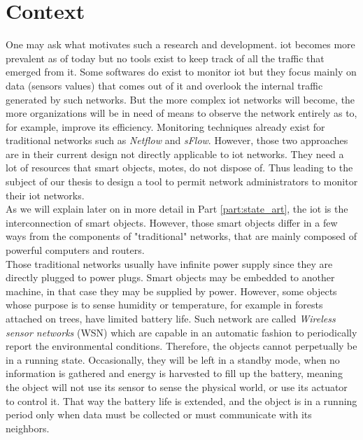 \section*{Context}

One may ask what motivates such a research and development. \acrshort{iot} becomes more prevalent as of today but no tools exist to keep track of all the traffic that emerged from it. Some softwares do exist to monitor \acrshort{iot} but they focus mainly on data (sensors values) that comes out of it and overlook the internal traffic generated by such networks. But the more complex \acrshort{iot} networks will become, the more organizations will be in need of means to observe the network entirely as to, for example, improve its efficiency. Monitoring techniques already exist for traditional networks such as \textit{Netflow} and \textit{sFlow}. However, those two approaches are in their current design not directly applicable to \acrshort{iot} networks. They need a lot of resources that smart objects, motes, do not dispose of. Thus leading to the subject of our thesis to design a tool to permit network administrators to monitor their \acrshort{iot} networks.\\

As we will explain later on in more detail in Part \ref{part:state_art}, the \acrlong{iot} is the interconnection of smart objects. However, those smart objects differ in a few ways from the components of "traditional" networks, that are mainly composed of powerful computers and routers.\\

Those traditional networks usually have infinite power supply since they are directly plugged to power plugs. Smart objects may be embedded to another machine, in that case they may be supplied by power. However, some objects whose purpose is to sense humidity or temperature, for example in forests attached on trees, have limited battery life.  Such network are called \textit{Wireless sensor networks} (WSN) which are capable in an automatic fashion to periodically report the environmental conditions. Therefore, the objects cannot perpetually be in a running state. Occasionally, they will be left in a standby mode, when no information is gathered and energy is harvested to fill up the battery, meaning the object will not use its sensor to sense the physical world, or use its actuator to control it. That way the battery life is extended, and the object is in a running period only when data must be collected or must communicate with its neighbors. \\

